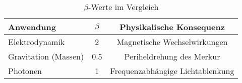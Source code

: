 \begin{table}[h]
\centering
\caption{$\beta$-Werte im Vergleich}
\begin{tabular}{lcc}
\hline
Anwendung & $\beta$ & Physikalische Konsequenz \\
\hline
Elektrodynamik & 2 & Magnetische Wechselwirkungen \\
Gravitation (Massen) & 0.5 & Periheldrehung des Merkur \\
Photonen & 1 & Frequenzabhängige Lichtablenkung \\
\hline
\end{tabular}
\end{table}